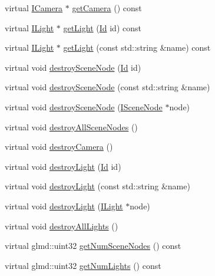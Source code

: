 \begin{DoxyCompactItemize}
\item 
virtual \hyperlink{classglr_1_1ICamera}{I\-Camera} $\ast$ \hyperlink{classglr_1_1BasicSceneManager_a69d8b07a49a9ad6d91fc064e1b7c5cb6}{get\-Camera} () const 
\item 
virtual \hyperlink{classglr_1_1ILight}{I\-Light} $\ast$ \hyperlink{classglr_1_1BasicSceneManager_a863d0680c1c93f8e040f09879795e7d2}{get\-Light} (\hyperlink{classglr_1_1Id}{Id} id) const 
\item 
virtual \hyperlink{classglr_1_1ILight}{I\-Light} $\ast$ \hyperlink{classglr_1_1BasicSceneManager_a12c8659e6a1f2d65f9e996c6eaa2af38}{get\-Light} (const std\-::string \&name) const 
\item 
virtual void \hyperlink{classglr_1_1BasicSceneManager_a6636c3383cdb158bc0fb1f3f8416b1ef}{destroy\-Scene\-Node} (\hyperlink{classglr_1_1Id}{Id} id)
\item 
virtual void \hyperlink{classglr_1_1BasicSceneManager_ac2d0f412e6e13dace9fe8a213821e239}{destroy\-Scene\-Node} (const std\-::string \&name)
\item 
virtual void \hyperlink{classglr_1_1BasicSceneManager_abff52d28cd79e41b03d1b9f90b3625d5}{destroy\-Scene\-Node} (\hyperlink{classglr_1_1ISceneNode}{I\-Scene\-Node} $\ast$node)
\item 
virtual void \hyperlink{classglr_1_1BasicSceneManager_a8225e73ddb85a8aaa99213010b3bcdc1}{destroy\-All\-Scene\-Nodes} ()
\item 
virtual void \hyperlink{classglr_1_1BasicSceneManager_aedcd75c93886c72f47792db428b09ff1}{destroy\-Camera} ()
\item 
virtual void \hyperlink{classglr_1_1BasicSceneManager_ae5fade30580a6bd2376094f623afdb53}{destroy\-Light} (\hyperlink{classglr_1_1Id}{Id} id)
\item 
virtual void \hyperlink{classglr_1_1BasicSceneManager_ac7db53efa356bf505fe99eccd871e8c9}{destroy\-Light} (const std\-::string \&name)
\item 
virtual void \hyperlink{classglr_1_1BasicSceneManager_a2e939d9e4d5e7e4d513f25a75a0dcd0b}{destroy\-Light} (\hyperlink{classglr_1_1ILight}{I\-Light} $\ast$node)
\item 
virtual void \hyperlink{classglr_1_1BasicSceneManager_a5b22c15f1fb00f645a25ccc8782aac26}{destroy\-All\-Lights} ()
\item 
virtual glmd\-::uint32 \hyperlink{classglr_1_1BasicSceneManager_a51577c953e4f87d56294361739b516ae}{get\-Num\-Scene\-Nodes} () const 
\item 
virtual glmd\-::uint32 \hyperlink{classglr_1_1BasicSceneManager_add01b8e89c28b2c5ea9266b47b023613}{get\-Num\-Lights} () const 

\end{DoxyCompactItemize}
